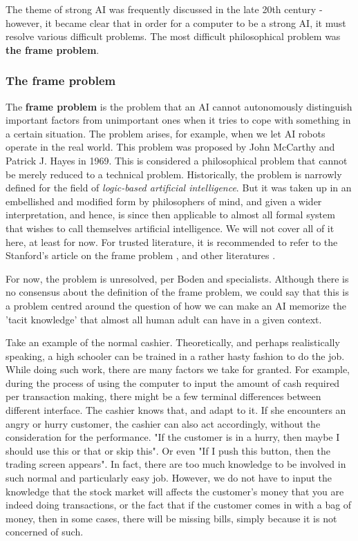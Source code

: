 The theme of strong AI was frequently discussed in the late 20th century - however, it became clear that in order for a computer to be a strong AI, it must resolve various difficult problems. The most difficult philosophical problem was \textbf{the frame problem}.
\subsubsection{The frame problem}
The \textbf{frame problem} is the problem that an AI cannot autonomously distinguish important factors from unimportant ones when it tries to cope with something in a certain situation. The problem arises, for example, when we let AI robots operate in the real world. This problem was proposed by John McCarthy and Patrick J. Hayes in 1969. This is considered a philosophical problem that cannot be merely reduced to a technical problem. Historically, the problem is narrowly defined for the field of \textit{logic-based artificial intelligence}. But it was taken up in an embellished and modified form by philosophers of mind, and given a wider interpretation, and hence, is since then applicable to almost all formal system that wishes to call themselves artificial intelligence. We will not cover all of it here, at least for now. For trusted literature, it is recommended to refer to the Stanford's article on the frame problem \cite{sep-frame-problem}, and other literatures \cite{FrameGryzJarek,SeagerFrameAxiological,Briggs2014MachineE}. 

For now, the problem is unresolved, per Boden and specialists. Although there is no consensus about the definition of the frame problem, we could say that this is a problem centred around the question of how we can make an AI memorize the 'tacit knowledge' that almost all human adult can have in a given context.

Take an example of the normal cashier. Theoretically, and perhaps realistically speaking, a high schooler can be trained in a rather hasty fashion to do the job. While doing such work, there are many factors we take for granted. For example, during the process of using the computer to input the amount of cash required per transaction making, there might be a few terminal differences between different interface. The cashier knows that, and adapt to it. If she encounters an angry or hurry customer, the cashier can also act accordingly, without the consideration for the performance. "If the customer is in a hurry, then maybe I should use this or that or skip this". Or even "If I push this button, then the trading screen appears". In fact, there are too much knowledge to be involved in such normal and particularly easy job. However, we do not have to input the knowledge that the stock market will affects the customer's money that you are indeed doing transactions, or the fact that if the customer comes in with a bag of money, then in some cases, there will be missing bills, simply because it is not concerned of such.

